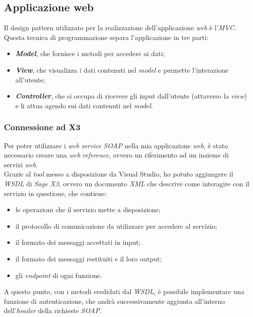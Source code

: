 \subsection{Applicazione web}
Il design pattern utilizzato per la realizzazione dell'applicazione \textit{web} è l'\textit{MVC}.\\
Questa tecnica di programmazione separa l'applicazione in tre parti:
\begin{itemize}
	\item \textbf{\textit{Model}}, che fornisce i metodi per accedere ai dati;
	\item \textbf{\textit{View}}, che visualizza i dati contenuti nel \textit{model} e permette l'interazione all'utente;
	\item \textbf{\textit{Controller}}, che si occupa di ricevere gli input dall'utente (attaverso la \textit{view}) e li attua agendo sui dati contenuti nel \textit{model}.
\end{itemize}

\vspace{15pt}
\subsubsection{Connessione ad X3}
Per poter utilizzare i \textit{web service} \textit{SOAP} nella mia applicazione \textit{web}, è stato necessario creare una \textit{web reference}, ovvero un riferimento ad un insieme di servizi \textit{web}.\\
Grazie al \textit{tool} messo a disposizione da Visual Studio, ho potuto aggiungere il \textit{WSDL} di \textit{Sage X3}, ovvero un documento \textit{XML} che descrive come interagire con il servizio in questione, che contiene:
\begin{itemize}
	\item le operazioni che il servizio mette a disposizione;
	\item il protocollo di comunicazione da utilizzare per accedere al servizio;
	\item il formato dei messaggi accettati in input;
	\item il formato dei messaggi restituiti e il loro output;
	\item gli \textit{endpoint} di ogni funzione.
\end{itemize}
A questo punto, con i metodi eredidati dal \textit{WSDL}, è possibile implementare una funzione di autenticazione, che andrà successivamente aggiunta all'interno dell'\textit{header} della richieste \textit{SOAP}.


